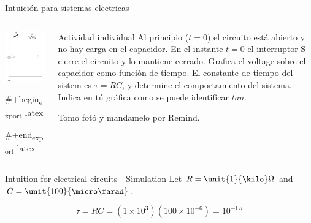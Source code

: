 \documentclass[presentation,aspectratio=169]{beamer}
\begin{document}
\begin{frame}[label={sec:org0c3a87c}]{Intuición para sistemas electricas}
\begin{columns}
\begin{column}{0.4\columnwidth}
\begin{center}
\includegraphics[height=0.8\textheight]{../../figures/RC-circuit}
\end{center}

\#+begin\textsubscript{export} latex
\begin{center}
\end{center}
\#+end\textsubscript{export} latex
\end{column}

\begin{column}{0.6\columnwidth}
\alert{Actividad individual} Al principio (\(t=0\)) el circuito está abierto y no hay carga en el capacidor. En el instante \(t=0\) el interruptor S cierre el circuito y lo mantiene cerrado. Grafica el voltage sobre el capacidor como función de tiempo. El constante de tiempo del sistem es \(\tau=RC\), y determine el comportamiento del sistema. Indica en tú gráfica como se puede identificar \(tau\). 

Tomo fotó y mandamelo por \alert{Remind}.
\end{column}
\end{columns}
\end{frame}


\begin{frame}[label={sec:orgb0433e8}]{Intuition for electrical circuits - Simulation}
Let \(R=\unit{1}{\kilo}\Omega\) and \(C = \unit{100}{\micro\farad}\).

\[ \tau = RC = (1\times 10^{3})(100\times 10^{-6}) = \unit{10^{-1}}{\second} \]
\end{frame}
\end{document}
